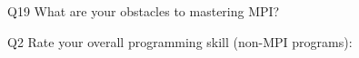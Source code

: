 \begin{description}%
\item{Q19} What are your obstacles to mastering MPI?%
\item{Q2} Rate your overall programming skill (non-MPI programs):%
\end{description}%
